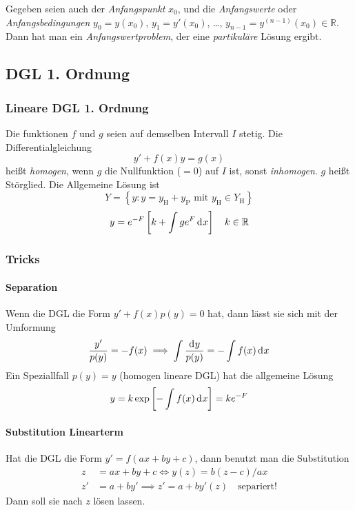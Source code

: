 \documentclass[margin=small, twocolumn]{hsrzf}
\numberwithin{equation}{subsection}
\begin{document}
Gegeben seien auch der \emph{Anfangspunkt}
\(x_0\), und
die \emph{Anfangswerte} oder \emph{Anfangsbedingungen}
\(y_0 = y(x_0)\),
\(y_1 = y'(x_0)\),
\dots,
\(y_{n-1} = y^{(n-1)}(x_0) \in \mathbb{R}\).
Dann hat man ein \emph{Anfangswertproblem}, der eine \emph{partikul\"are} L\"osung ergibt.

\subsection{DGL 1. Ordnung}
\subsubsection{Lineare DGL 1. Ordnung}
Die funktionen \(f\) und \(g\) seien auf demselben Intervall \(I\) stetig. Die Differentialgleichung
\[
    y' + f(x)y = g(x)
\]
hei{\ss}t \emph{homogen}, wenn \(g\) die Nullfunktion (\(=0\)) auf \(I\) ist, sonst \emph{inhomogen}. \(g\) hei{\ss}t St\"orglied.
Die Allgemeine L\"osung ist
\[
    Y = \left\{ y : y = y_\text{H} + y_\text{P} \text{ mit } y_\text{H} \in Y_\text{H}\right\}
\]
\[
    y = e^{-F}\left[k + \int ge^F\,\mathrm{d}^{} x\right]
    \quad k \in \mathbb{R}
\]

\subsubsection{Tricks}

\paragraph{Separation} Wenn die DGL die Form \(y' + f(x) p(y) = 0\) hat, dann l\"asst sie sich mit der Umformung
\[
    \frac{y'}{p(y)} = -f(x) \implies \int \frac{\mathrm{d}^{} y}{p(y)} = - \int f(x) \,\mathrm{d}^{} x
\]
Ein Speziallfall \(p(y) = y\) (homogen lineare DGL) hat die allgemeine L\"osung
\[
    y = k\exp\left[-\int f(x) \,\mathrm{d}^{} x \right] = k{ e}^{-F}
\]

\paragraph{Substitution Linearterm} Hat die DGL die Form \(y' = f(ax + by + c)\), dann benutzt man die Substitution
\begin{align*}
    z  &= ax + by + c \iff y(z) = b(z-c)/ax \\
    z' &= a + by' \implies z' = a + b y'(z) \quad\text{separiert!}
\end{align*}
Dann soll sie nach \(z\) l\"osen lassen.
\end{document}
